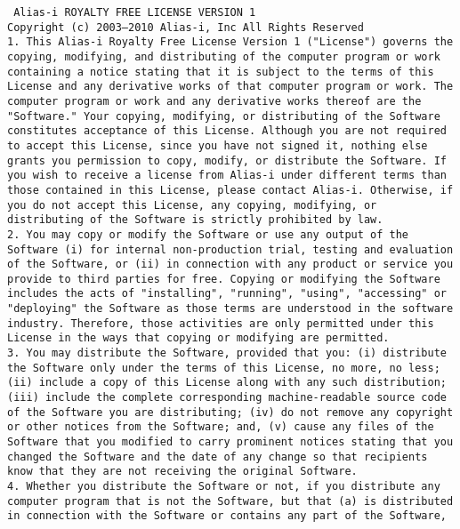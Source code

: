 \setlength{\baselineskip}{0.5\baselineskip}
{\tiny\tt
\noindent
Alias-i ROYALTY FREE LICENSE VERSION 1
\\[8pt]
Copyright (c) 2003--2010 Alias-i, Inc
All Rights Reserved
\\[8pt]
1. This Alias-i Royalty Free License Version 1 ("License") governs the
copying, modifying, and distributing of the computer program or work
containing a notice stating that it is subject to the terms of this
License and any derivative works of that computer program or work.
The computer program or work and any derivative works thereof are the
"Software." Your copying, modifying, or distributing of the Software
constitutes acceptance of this License.  Although you are not required
to accept this License, since you have not signed it, nothing else
grants you permission to copy, modify, or distribute the Software.  If
you wish to receive a license from Alias-i under different terms than
those contained in this License, please contact Alias-i.  Otherwise,
if you do not accept this License, any copying, modifying, or
distributing of the Software is strictly prohibited by law.
\\[8pt]
2. You may copy or modify the Software or use any output of the
Software (i) for internal non-production trial, testing and evaluation
of the Software, or (ii) in connection with any product or service you
provide to third parties for free.  Copying or modifying the Software
includes the acts of "installing", "running", "using", "accessing" or
"deploying" the Software as those terms are understood in the software
industry.  Therefore, those activities are only permitted under this
License in the ways that copying or modifying are permitted.
\\[8pt]
3. You may distribute the Software, provided that you: (i) distribute
the Software only under the terms of this License, no more, no less;
(ii) include a copy of this License along with any such distribution;
(iii) include the complete corresponding machine-readable source code
of the Software you are distributing; (iv) do not remove any copyright
or other notices from the Software; and, (v) cause any files of the
Software that you modified to carry prominent notices stating that you
changed the Software and the date of any change so that recipients
know that they are not receiving the original Software.
\\[8pt]
4. Whether you distribute the Software or not, if you distribute any
computer program that is not the Software, but that (a) is distributed
in connection with the Software or contains any part of the Software,
}
